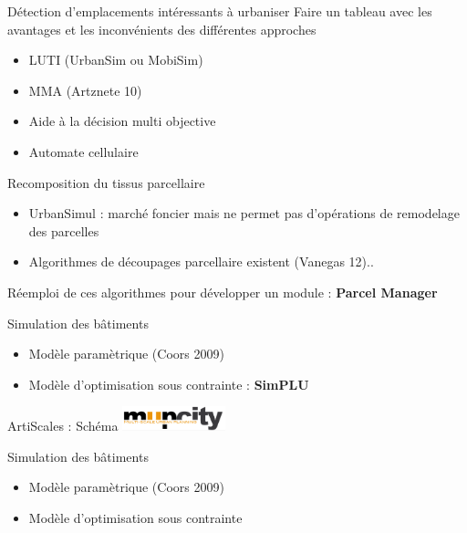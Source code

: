 \documentclass[xcolor=table]{beamer}
\begin{document}
\begin{frame}{Détection d'emplacements intéressants à urbaniser}
Faire un tableau avec les avantages et les inconvénients des différentes approches
	\begin{itemize}
		\item LUTI (UrbanSim ou MobiSim)
		\item MMA (Artznete 10)
		\item Aide à la décision multi objective
		\item Automate cellulaire
	\end{itemize}
\end{frame}

\begin{frame}{Recomposition du tissus parcellaire}
	\begin{itemize}
		\item UrbanSimul : marché foncier mais ne permet pas d'opérations de remodelage des parcelles
		\item Algorithmes de découpages parcellaire	existent (Vanegas 12).. 
	\end{itemize}
	\begin{block}{}
		Réemploi de ces algorithmes pour développer un module : \textbf{Parcel Manager}
	\end{block}
\end{frame}

\begin{frame}{Simulation des bâtiments}
	\begin{itemize}
		\item Modèle paramètrique (Coors 2009)
		\item Modèle d'optimisation sous contrainte	: \textbf{SimPLU}
	\end{itemize}
\end{frame}

\begin{frame}{ArtiScales : Schéma}
	\includegraphics[width=3cm]{Images/mup.png}
\end{frame}

\begin{frame}{Simulation des bâtiments}
	\begin{itemize}
		\item Modèle paramètrique (Coors 2009)
		\item Modèle d'optimisation sous contrainte	
	\end{itemize}
\end{frame}
\end{document}
